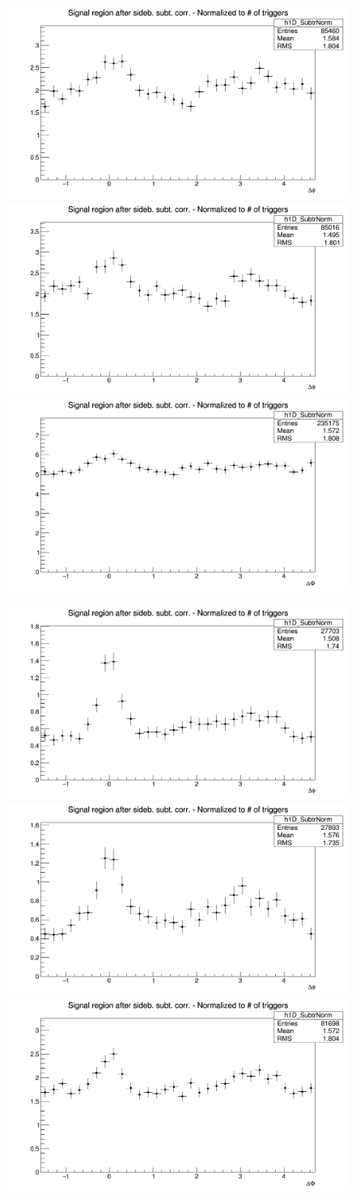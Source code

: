 \begin{figure}[!htbp]
{\includegraphics[width=0.31\linewidth, height=0.23\linewidth]{figures/Dzero/AzimCorrDistr_Dzero_Canvas_PtIntBins9to11_PoolInt_thrdot3to1dot.png}}
{\includegraphics[width=0.31\linewidth, height=0.23\linewidth]{figures/DplusPlotsweff/AzimCorrDistr_Dplus_Canvas_PtIntBins8to12_PoolInt_thrdot3to1dot.png}}
{\includegraphics[width=0.31\linewidth, height=0.23\linewidth]{figures/Dstar_wEFF/AzimCorrDistr_Dstar_Canvas_PtIntBins7to9_PoolInt_thrdot3to1dot.png}}

{\includegraphics[width=0.31\linewidth, height=0.23\linewidth]{figures/Dzero/AzimCorrDistr_Dzero_Canvas_PtIntBins9to11_PoolInt_thr1dotto2dot.png}}
{\includegraphics[width=0.31\linewidth, height=0.23\linewidth]{figures/DplusPlotsweff/AzimCorrDistr_Dplus_Canvas_PtIntBins8to12_PoolInt_thr1dotto2dot.png}}
{\includegraphics[width=0.31\linewidth, height=0.23\linewidth]{figures/Dstar_wEFF/AzimCorrDistr_Dstar_Canvas_PtIntBins7to9_PoolInt_thr1dotto2dot.png}}

\end{figure}

